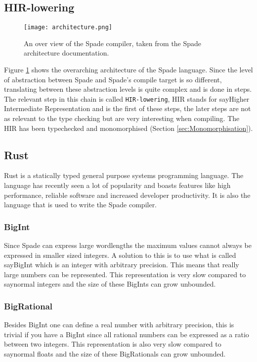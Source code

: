 \subsection{HIR-lowering}
\begin{figure}[h!]
  \texttt{[image: architecture.png]}
  \caption{An over view of the Spade compiler, taken from the Spade architecture documentation\cite{src:Architecture}.}
  \label{figArch}
\end{figure}

Figure \ref{figArch} shows the overarching architecture of the Spade language. Since the level of abstraction between Spade and Spade's compile target is so different, translating between these abstraction levels is quite complex and is done in steps. The relevant step in this chain is called \verb+HIR-lowering+, HIR stands for say{Higher Intermediate Representation} and is the first of these steps, the later steps are not as relevant to the type checking but are very interesting when compiling. The HIR has been typechecked and monomorphised (Section \ref{sec:Monomorphisation})\cite{src:Architecture}.

\subsection{Rust}
Rust is a statically typed general purpose systems programming language. The language has recently seen a lot of popularity and boasts features like high performance, reliable software and increased developer productivity. It is also the language that is used to write the Spade compiler. \cite{src:Rust}

\subsubsection{BigInt}
Since Spade can express large wordlengths the maximum values cannot always be expressed in smaller sized integers. A solution to this is to use what is called say{BigInt} which is an integer with arbitrary precision. This means that really large numbers can be represented. This representation is very slow compared to say{normal} integers and the size of these BigInts can grow unbounded.

\subsubsection{BigRational}
Besides BigInt one can define a real number with arbitrary precision, this is trivial if you have a BigInt since all rational numbers can be expressed as a ratio between two integers. This representation is also very slow compared to say{normal} floats and the size of these BigRationals can grow unbounded. 


